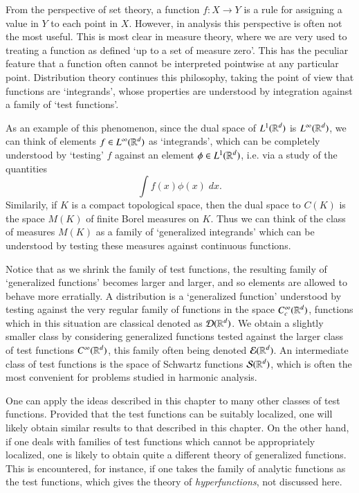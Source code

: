 From the perspective of set theory, a function $f: X \to Y$ is a rule for assigning a value in $Y$ to each point in $X$. However, in analysis this perspective is often not the most useful. This is most clear in measure theory, where we are very used to treating a function as defined `up to a set of measure zero'. This has the peculiar feature that a function often cannot be interpreted pointwise at any particular point. Distribution theory continues this philosophy, taking the point of view that functions are `integrands', whose properties are understood by integration against a family of `test functions'.

As an example of this phenomenon, since the dual space of $L^1(\operatorname{\mathbb{R}}^d)$ is $L^\infty(\operatorname{\mathbb{R}}^d)$, we can think of elements $f \in L^\infty(\operatorname{\mathbb{R}}^d)$ as `integrands', which can be completely understood by `testing' $f$ against an element $\phi \in L^1(\operatorname{\mathbb{R}}^d)$, i.e. via a study of the quantities
%
\[ \int f(x) \phi(x)\; dx. \]
%
Similarily, if $K$ is a compact topological space, then the dual space to $C(K)$ is the space $M(K)$ of finite Borel measures on $K$. Thus we can think of the class of measures $M(K)$ as a family of `generalized integrands' which can be understood by testing these measures against continuous functions.

Notice that as we shrink the family of test functions, the resulting family of `generalized functions' becomes larger and larger, and so elements are allowed to behave more erratially. A distribution is a `generalized function' understood by testing against the very regular family of functions in the space $C_c^\infty(\operatorname{\mathbb{R}}^d)$, functions which in this situation are classical denoted as $\operatorname{\mathcal{D}}(\operatorname{\mathbb{R}}^d)$. We obtain a slightly smaller class by considering generalized functions tested against the larger class of test functions $C^\infty(\operatorname{\mathbb{R}}^d)$, this family often being denoted $\operatorname{\mathcal{E}}(\operatorname{\mathbb{R}}^d)$. An intermediate class of test functions is the space of Schwartz functions $\operatorname{\mathcal{S}}(\operatorname{\mathbb{R}}^d)$, which is often the most convenient for problems studied in harmonic analysis. 

One can apply the ideas described in this chapter to many other classes of test functions. Provided that the test functions can be suitably localized, one will likely obtain similar results to that described in this chapter. On the other hand, if one deals with families of test functions which cannot be appropriately localized, one is likely to obtain quite a different theory of generalized functions. This is encountered, for instance, if one takes the family of analytic functions as the test functions, which gives the theory of \emph{hyperfunctions}, not discussed here.

